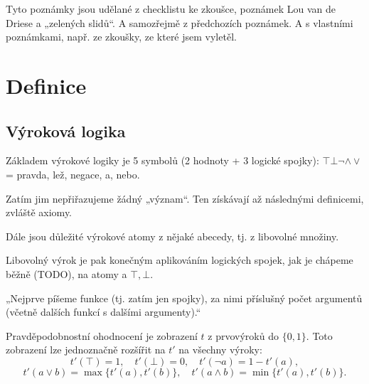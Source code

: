 \documentclass[12pt]{article}                   %
\begin{document}
\begin{poznamka}
    Tyto poznámky jsou udělané z checklistu ke zkoušce, poznámek Lou van de Driese a „zelených slidů“. A samozřejmě z předchozích poznámek. A s vlastními poznámkami, např. ze zkoušky, ze které jsem vyletěl.
\end{poznamka}

\section{Definice}
    \subsection{Výroková logika}
        \begin{definice}
            Základem výrokové logiky je 5 symbolů (2 hodnoty + 3 logické spojky): $\top \bot \neg \land \lor$ = pravda, lež, negace, a, nebo.

            Zatím jim nepřiřazujeme žádný „význam“. Ten získávají až následnými definicemi, zvláště axiomy.
        \end{definice}

        \begin{definice}
            Dále jsou důležité výrokové atomy z nějaké abecedy, tj. z libovolné množiny.
        \end{definice}

        \begin{definice}[Výroky]
            Libovolný výrok je pak konečným aplikováním logických spojek, jak je chápeme běžně (TODO), na atomy a $\top, \bot$.
        \end{definice}

        \begin{definice}[Polská (= prefixová) notace]
            „Nejprve píšeme funkce (tj. zatím jen spojky), za nimi příslušný počet argumentů (včetně dalších funkcí s dalšími argumenty).“
        \end{definice}

        \begin{definice}
            Pravděpodobnostní ohodnocení je zobrazení $t$ z prvovýroků do $\{0, 1\}$. Toto zobrazení lze jednoznačně rozšířit na $t'$ na všechny výroky:
            $$ t'(\top) = 1, \quad t'(\bot) = 0, \quad t'(\neg a) = 1 - t'(a), $$
            $$ t'(a \lor b) = \max\{t'(a), t'(b)\}, \quad t'(a \land b) = \min\{t'(a), t'(b)\}. $$
        \end{definice}
\end{document}
